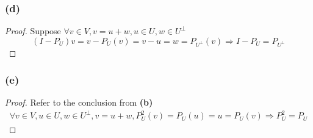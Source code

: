 \documentclass{article}
\newtheorem*{proof}{Proof}
\begin{document}
\subsubsection*{(d)}
\begin{proof}
    Suppose $\forall v \in V, v = u + w, u \in U, w \in U^\bot$
    \begin{equation*}
        (I - P_U)v = v - P_U(v) = v - u = w = P_{U^\bot}(v) \Rightarrow I - P_U = P_{U^\bot}
    \end{equation*}
\end{proof}

\subsubsection*{(e)}
\begin{proof}
    Refer to the conclusion from \textbf{(b)}
    \begin{equation*}
        \begin{split}
            \forall v \in V, u \in U, w \in U^{\bot}, v = u + w, P^2_U(v) = P_U(u) = u = P_U(v) \Rightarrow P^2_U = P_U
        \end{split}
    \end{equation*}
\end{proof}
\end{document}

